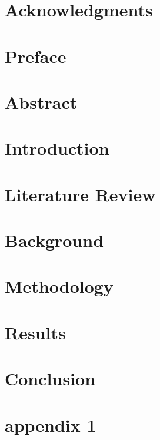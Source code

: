 \documentclass[12pt, twoside, openright]{report}
\begin{document}
	
	
	
	\chapter*{}
	
	
	\chapter*{Acknowledgments}
	
	\newpage
	
	\chapter*{Preface}
	
	
	\chapter*{Abstract}
	
	
	\tableofcontents
	\listoffigures
	\listoftables
	
	\chapter{Introduction}
	
	
	\chapter{Literature Review}
	
	
	\chapter{Background}
	
	
	\chapter{Methodology}
	
	
	\chapter{Results}
	
	
	\chapter{Conclusion}
	
	
	\appendix
	\chapter{appendix 1}
	
	
	{}
	
\end{document}

